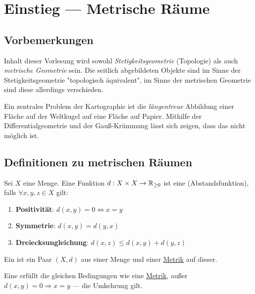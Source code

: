\chapter{Einstieg --- Metrische Räume}

\section{Vorbemerkungen}

Inhalt dieser Vorlesung wird sowohl \emph{Stetigkeitsgeometrie} (Topologie) als auch \emph{metrische Geometrie} sein. Die seitlich abgebildeten Objekte sind im Sinne der Stetigkeitsgeometrie "topologisch äquivalent", im Sinne der metrischen Geometrie sind diese allerdings verschieden.

\begin{remark}[Kartographieproblem]
  Ein zentrales Problem der Kartographie ist die \emph{längentreue} Abbildung einer Fläche auf der Weltkugel auf eine Fläche auf Papier. Mithilfe der Differentialgeometrie und der Gauß-Krümmung lässt sich zeigen, dass das nicht möglich ist.
\end{remark}

\section{Definitionen zu metrischen Räumen}

\begin{definition}[Metrik]
  \label{def:metrik}
  Sei $ X $ eine Menge. Eine Funktion $ d: X \times X \to \mathbb{R}_{\geq 0} $ ist eine  (Abstandsfunktion), falls $ \forall x, y, z \in X $ gilt:
  \begin{enumerate}
    \item \textbf{Positivität}: $ d(x, y) = 0 \Leftrightarrow x = y $ 
    \item \textbf{Symmetrie}: $ d(x,y) = d(y,x) $
    \item \textbf{Dreiecksungleichung}: $ d(x,z) \leq d(x,y) + d(y,z) $
  \end{enumerate}
\end{definition}

\begin{definition}
  \label{def:metrischerRaum}
  Ein  ist ein Paar $ (X,d) $ aus einer Menge und einer \hyperref[def:metrik]{Metrik} auf dieser.
\end{definition}

\begin{definition}[Pseudometrik]
  \label{def:pseudometrik}
  Eine  erfüllt die gleichen Bedingungen wie eine \hyperref[def:metrik]{Metrik}, außer $ d(x,y) = 0 \Rightarrow x = y $ --- die Umkehrung gilt.
\end{definition}

